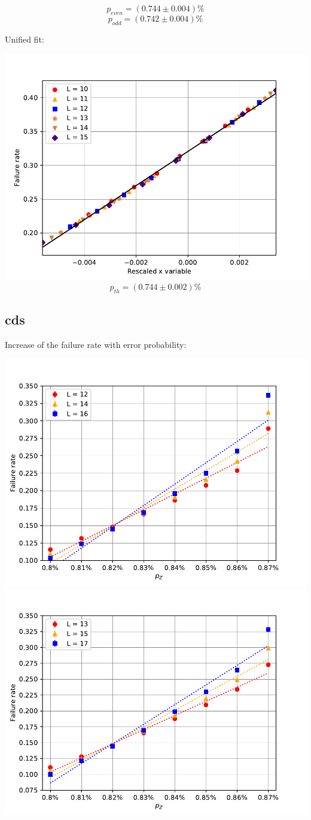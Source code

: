 \documentclass[pra]{revtex4-1}
\begin{document}
\[  p_{even} = (0.744 \pm 0.004)\% \]
\[  p_{odd} = (0.742 \pm 0.004)\% \]
\clearpage 

Unified fit: \begin{center} 

\includegraphics[width=.9\textwidth]{../graphs-paper2/cbs-dephasing-rescaled.pdf}
\[  p_{th} = (0.744 \pm 0.002)\% \] \end{center}
\clearpage 

\subsection*{cds}
\noindent Increase of the failure rate with error probability: 
  
\includegraphics[width=.49\textwidth]{../graphs-paper2/cds-dephasing-even.pdf}
\includegraphics[width=.49\textwidth]{../graphs-paper2/cds-dephasing-odd.pdf}
\end{document}
